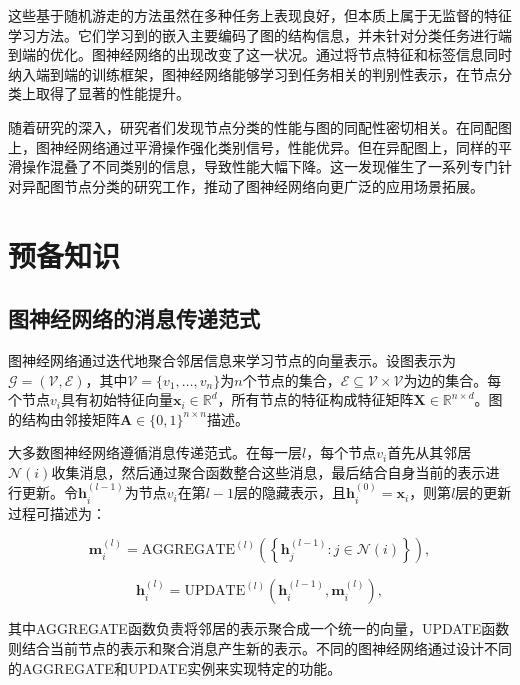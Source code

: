 \documentclass[a4paper,10pt]{article}
\begin{document}
这些基于随机游走的方法虽然在多种任务上表现良好，但本质上属于无监督的特征学习方法。它们学习到的嵌入主要编码了图的结构信息，并未针对分类任务进行端到端的优化。图神经网络的出现改变了这一状况。通过将节点特征和标签信息同时纳入端到端的训练框架，图神经网络能够学习到任务相关的判别性表示，在节点分类上取得了显著的性能提升。

随着研究的深入，研究者们发现节点分类的性能与图的同配性密切相关。在同配图上，图神经网络通过平滑操作强化类别信号，性能优异。但在异配图上，同样的平滑操作混叠了不同类别的信息，导致性能大幅下降。这一发现催生了一系列专门针对异配图节点分类的研究工作，推动了图神经网络向更广泛的应用场景拓展。

\section{预备知识}

\subsection{图神经网络的消息传递范式}

图神经网络通过迭代地聚合邻居信息来学习节点的向量表示。设图表示为$\mathcal{G}=(\mathcal{V},\mathcal{E})$，其中$\mathcal{V}=\{v_1,\dots,v_n\}$为$n$个节点的集合，$\mathcal{E}\subseteq\mathcal{V}\times\mathcal{V}$为边的集合。每个节点$v_i$具有初始特征向量$\mathbf{x}_i\in\mathbb{R}^d$，所有节点的特征构成特征矩阵$\mathbf{X}\in\mathbb{R}^{n\times d}$。图的结构由邻接矩阵$\mathbf{A}\in\{0,1\}^{n\times n}$描述。

大多数图神经网络遵循消息传递范式。在每一层$l$，每个节点$v_i$首先从其邻居$\mathcal{N}(i)$收集消息，然后通过聚合函数整合这些消息，最后结合自身当前的表示进行更新。令$\mathbf{h}_i^{(l-1)}$为节点$v_i$在第$l-1$层的隐藏表示，且$\mathbf{h}_i^{(0)}=\mathbf{x}_i$，则第$l$层的更新过程可描述为：

\begin{equation}
\mathbf{m}_i^{(l)} = \text{AGGREGATE}^{(l)}\left(\left\{\mathbf{h}_j^{(l-1)} : j\in\mathcal{N}(i)\right\}\right),
\end{equation}

\begin{equation}
\mathbf{h}_i^{(l)} = \text{UPDATE}^{(l)}\left(\mathbf{h}_i^{(l-1)}, \mathbf{m}_i^{(l)}\right),
\end{equation}

其中AGGREGATE函数负责将邻居的表示聚合成一个统一的向量，UPDATE函数则结合当前节点的表示和聚合消息产生新的表示。不同的图神经网络通过设计不同的AGGREGATE和UPDATE实例来实现特定的功能。
\end{document}
